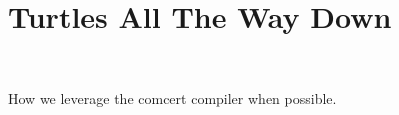 \section{Turtles All The Way Down}~\label{sec:compcert}

How we leverage the comcert compiler when possible. 


